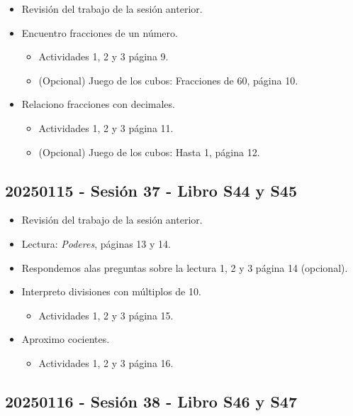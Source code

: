 \documentclass[a4paper,12pt]{article}
\begin{document}
\begin{itemize}
    \item Revisión del trabajo de la sesión anterior.
    \item Encuentro fracciones de un número.
    \begin{itemize}
        \item Actividades 1, 2 y 3 página 9.
        \item (Opcional) Juego de los cubos: Fracciones de 60, página 10.
    \end{itemize}
    \item Relaciono fracciones con decimales.
    \begin{itemize}
        \item Actividades 1, 2 y 3 página 11.
        \item (Opcional) Juego de los cubos: Hasta 1, página 12.
    \end{itemize}
\end{itemize}

\subsection{20250115 - Sesión 37 - Libro S44 y S45}

\begin{itemize}
    \item Revisión del trabajo de la sesión anterior.
    \item Lectura: \textit{Poderes}, páginas 13 y 14.
    \item Respondemos alas preguntas sobre la lectura 1, 2 y 3 página 14 (opcional).
    \item Interpreto divisiones con múltiplos de 10.
    \begin{itemize}
        \item Actividades 1, 2 y 3 página 15.
    \end{itemize}
    \item Aproximo cocientes.
    \begin{itemize}
        \item Actividades 1, 2 y 3 página 16.
    \end{itemize}
\end{itemize}

\subsection{20250116 - Sesión 38 - Libro S46 y S47}
\end{document}
